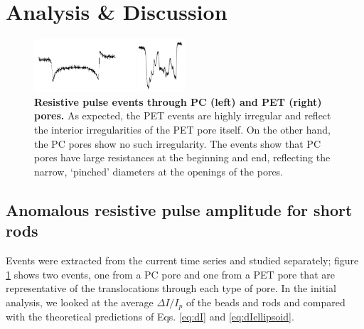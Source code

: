 	
	\section{Analysis \& Discussion}
	
	
		\begin{figure}
			\includegraphics[width=0.5\textwidth]{PCPETevents}
			\caption{\textbf{Resistive pulse events through PC (left) and PET (right) pores.} As expected, the PET events are highly irregular and reflect the interior irregularities of the PET pore itself. On the other hand, the PC pores show no such irregularity. The events show that PC pores have large resistances at the beginning and end, reflecting the narrow, `pinched' diameters at the openings of the pores.}
			\label{fig:PCPETevents}
		\end{figure}

	
		\subsection{Anomalous resistive pulse amplitude for short rods}
			Events were extracted from the current time series and studied separately; figure \ref{fig:PCPETevents} shows two events, one from a PC pore and one from a PET pore that are representative of the translocations through each type of pore. In the initial analysis, we looked at the average $\Delta I/I_{p}$ of the beads and rods and compared with the theoretical predictions of Eqs. \ref{eq:dI} and \ref{eq:dIellipsoid}. 
			
